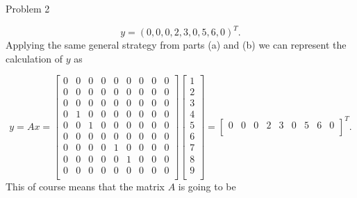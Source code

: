 \begin{problem}{Problem 2}
\begin{highlight}
        \setcounter{equation}{0}
        \begin{equation}
            y = (0,0,0,2,3,0,5,6,0)^{T}.
        \end{equation}
        Applying the same general strategy from parts (a) and (b) we can represent the calculation of $y$ as

        \begin{equation}
            y = Ax = 
            \begin{bmatrix}
                0 & 0 & 0 & 0 & 0 & 0 & 0 & 0 & 0 \\
                0 & 0 & 0 & 0 & 0 & 0 & 0 & 0 & 0 \\
                0 & 0 & 0 & 0 & 0 & 0 & 0 & 0 & 0 \\
                0 & 1 & 0 & 0 & 0 & 0 & 0 & 0 & 0 \\
                0 & 0 & 1 & 0 & 0 & 0 & 0 & 0 & 0 \\
                0 & 0 & 0 & 0 & 0 & 0 & 0 & 0 & 0 \\
                0 & 0 & 0 & 0 & 1 & 0 & 0 & 0 & 0 \\
                0 & 0 & 0 & 0 & 0 & 1 & 0 & 0 & 0 \\
                0 & 0 & 0 & 0 & 0 & 0 & 0 & 0 & 0 \\
            \end{bmatrix}
            \begin{bmatrix}
                1 \\
                2 \\
                3 \\
                4 \\
                5 \\
                6 \\
                7 \\
                8 \\
                9 \\
            \end{bmatrix}
            = 
            \begin{bmatrix}
                0 & 0 & 0 & 2 & 3 & 0 & 5 & 6 & 0 \\
            \end{bmatrix}^{T}.
        \end{equation}
        This of course means that the matrix $A$ is going to be


\end{highlight}
\end{problem}
